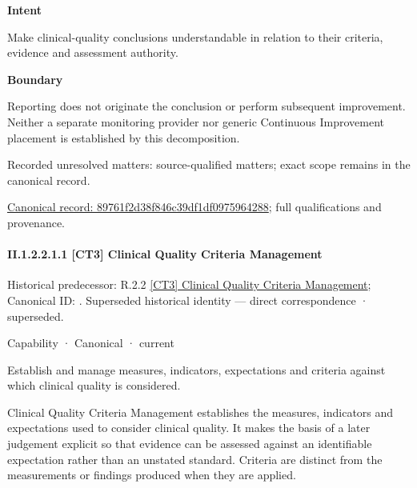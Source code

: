 \textbf{Intent}



Make clinical-quality conclusions understandable in relation to their criteria, evidence and assessment authority.



\textbf{Boundary}



Reporting does not originate the conclusion or perform subsequent improvement. Neither a separate monitoring provider nor generic Continuous Improvement placement is established by this decomposition.


{\small Recorded unresolved matters: source-qualified matters; exact scope remains in the canonical record.}\par
{\footnotesize \href{../../../../continuum/strategy/capability/89761f2d38f846c39df1df0975964288.md}{Canonical record: 89761f2d38f846c39df1df0975964288}; full qualifications and provenance.}\par
\paragraph*{II.1.2.2.1.1 [CT3] Clinical Quality Criteria Management}
\label{navigation:II.1.2.2.1.1}

{\small Historical predecessor: R.2.2 \hyperref[element:7a51321b00464016920976b269981edd]{[CT3] Clinical Quality Criteria Management}; Canonical ID: \texttt{}. Superseded historical identity — direct correspondence · superseded.}\par
\label{element:1f48527a9a7c4382a7f8a660ccb9f29f}
{\small Capability · Canonical · current}\par

Establish and manage measures, indicators, expectations and criteria against which clinical quality is considered.



Clinical Quality Criteria Management establishes the measures, indicators and expectations used to consider clinical quality. It makes the basis of a later judgement explicit so that evidence can be assessed against an identifiable expectation rather than an unstated standard. Criteria are distinct from the measurements or findings produced when they are applied.



